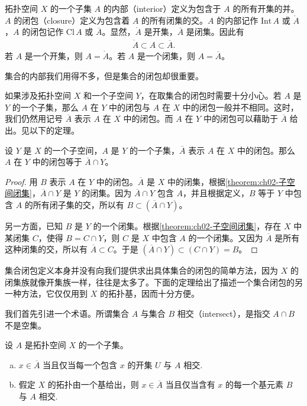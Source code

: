 \documentclass[../../main.tex]{subfiles}
\begin{document}
拓扑空间 $X$ 的一个子集 $A$ 的内部（interior）定义为包含于 $A$ 的所有开集的并。$A$ 的闭包（closure）定义为包含着 $A$ 的所有闭集的交。$A$ 的内部记作 $\mathrm{Int}\,A$ 或 $\mathring{A}$，$A$ 的闭包记作 $\mathrm{Cl}\,A$ 或 $\overline{A}$。显然，$\mathring{A}$ 是开集，$\overline{A}$ 是闭集。因此有
\begin{align*}
\mathring{A} \subset A \subset \overline{A}.
\end{align*}
若 $A$ 是一个开集，则 $A = \mathring{A}$。若 $A$ 是一个闭集，则 $A = \overline{A}$。

集合的内部我们用得不多，但是集合的闭包却很重要。

如果涉及拓扑空间 $X$ 和一个子空间 $Y$，在取集合的闭包时需要十分小心。若 $A$ 是 $Y$ 的一个子集，那么 $A$ 在 $Y$ 中的闭包与 $A$ 在 $X$ 中的闭包一般并不相同。这时，我们仍然用记号 $\overline{A}$ 表示 $A$ 在 $X$ 中的闭包。而 $A$ 在 $Y$ 中的闭包可以藉助于 $\overline{A}$ 给出。见以下的定理。

\begin{theorem}[子空间中的闭包]\label{theorem:ch02-子空间闭包}
设 $Y$ 是 $X$ 的一个子空间，$A$ 是 $Y$ 的一个子集，$\overline{A}$ 表示 $A$ 在 $X$ 中的闭包。那么 $A$ 在 $Y$ 中的闭包等于 $\overline{A} \cap Y$。
\end{theorem}

\begin{proof}
用 $B$ 表示 $A$ 在 $Y$ 中的闭包。$\overline{A}$ 是 $X$ 中的闭集，根据\cref{theorem:ch02-子空间闭集}，$\overline{A} \cap Y$ 是 $Y$ 的闭集。因为 $\overline{A} \cap Y$ 包含 $A$，并且根据定义，$B$ 等于 $Y$ 中包含 $A$ 的所有闭子集的交，所以有 $B \subset (\overline{A} \cap Y)$。

另一方面，已知 $B$ 是 $Y$ 的一个闭集。根据\cref{theorem:ch02-子空间闭集}，存在 $X$ 中某闭集 $C$，使得 $B = C \cap Y$，则 $C$ 是 $X$ 中包含 $A$ 的一个闭集。又因为 $\overline{A}$ 是所有这种闭集的交，所以有 $\overline{A} \subset C$。于是 $(\overline{A} \cap Y) \subset (C \cap Y) = B$。
\end{proof}

集合闭包定义本身并没有向我们提供求出具体集合的闭包的简单方法，因为 $X$ 的闭集族就像开集族一样，往往是太多了。下面的定理给出了描述一个集合闭包的另一种方法，它仅仅用到 $X$ 的拓扑基，因而十分方便。

我们首先引进一个术语。所谓集合 $A$ 与集合 $B$ 相交（intersect），是指交 $A \cap B$ 不是空集。

\begin{theorem}[闭包的邻域判别]\label{theorem:ch02-闭包邻域}
设 $A$ 是拓扑空间 $X$ 的一个子集。
\begin{enumerate}[(a)]
\item $x \in \overline{A}$ 当且仅当每一个包含 $x$ 的开集 $U$ 与 $A$ 相交.
\item 假定 $X$ 的拓扑由一个基给出，则 $x \in \overline{A}$ 当且仅当含有 $x$ 的每一个基元素 $B$ 与 $A$ 相交.
\end{enumerate}
\end{theorem}
\end{document}
